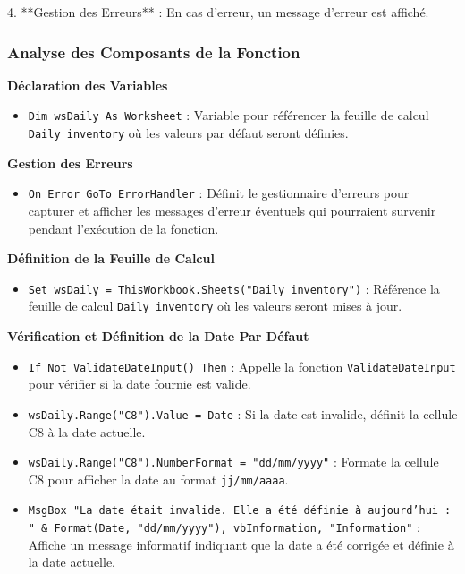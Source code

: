 \documentclass[a4paper, oneside, 12pt, final]{extreport}
\begin{document}
4. **Gestion des Erreurs** : En cas d'erreur, un message d'erreur est affiché.

\subsubsection{Analyse des Composants de la Fonction}

\textbf{Déclaration des Variables}

\begin{itemize}
    \item \texttt{Dim wsDaily As Worksheet} : Variable pour référencer la feuille de calcul \texttt{Daily inventory} où les valeurs par défaut seront définies.
\end{itemize}

\textbf{Gestion des Erreurs}

\begin{itemize}
    \item \texttt{On Error GoTo ErrorHandler} : Définit le gestionnaire d'erreurs pour capturer et afficher les messages d'erreur éventuels qui pourraient survenir pendant l'exécution de la fonction.
\end{itemize}

\textbf{Définition de la Feuille de Calcul}

\begin{itemize}
    \item \texttt{Set wsDaily = ThisWorkbook.Sheets("Daily inventory")} : Référence la feuille de calcul \texttt{Daily inventory} où les valeurs seront mises à jour.
\end{itemize}

\textbf{Vérification et Définition de la Date Par Défaut}

\begin{itemize}
    \item \texttt{If Not ValidateDateInput() Then} : Appelle la fonction \texttt{ValidateDateInput} pour vérifier si la date fournie est valide.
    \item \texttt{wsDaily.Range("C8").Value = Date} : Si la date est invalide, définit la cellule C8 à la date actuelle.
    \item \texttt{wsDaily.Range("C8").NumberFormat = "dd/mm/yyyy"} : Formate la cellule C8 pour afficher la date au format \texttt{jj/mm/aaaa}.
    \item \texttt{MsgBox "La date était invalide. Elle a été définie à aujourd'hui : " \& Format(Date, "dd/mm/yyyy"), vbInformation, "Information"} : Affiche un message informatif indiquant que la date a été corrigée et définie à la date actuelle.
\end{itemize}
\end{document}
